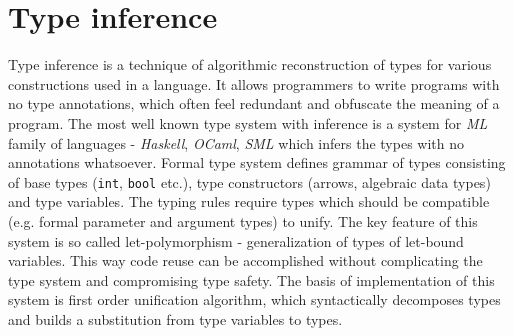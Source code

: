 \documentclass[inz, english, shortabstract]{iithesis}
\begin{document}
\section{Type inference}
Type inference is a technique of algorithmic reconstruction of types for various constructions used in a language.
It allows programmers to write programs with no type annotations, which often feel redundant and obfuscate the meaning of a program.
The most well known type system with inference is a system for \emph{ML} family of languages - \emph{Haskell}, \emph{OCaml}, \emph{SML} which infers the types with no annotations whatsoever.
Formal type system defines grammar of types consisting of base types (\texttt{int}, \texttt{bool} etc.), type constructors (arrows, algebraic data types) and type variables.
The typing rules require types which should be compatible (e.g. formal parameter and argument types) to unify.
The key feature of this system is so called let-polymorphism - generalization of types of let-bound variables.
This way code reuse can be accomplished without complicating the type system and compromising type safety.
The basis of implementation of this system is first order unification algorithm, which syntactically decomposes types and builds a substitution from type variables to types.
\end{document}

